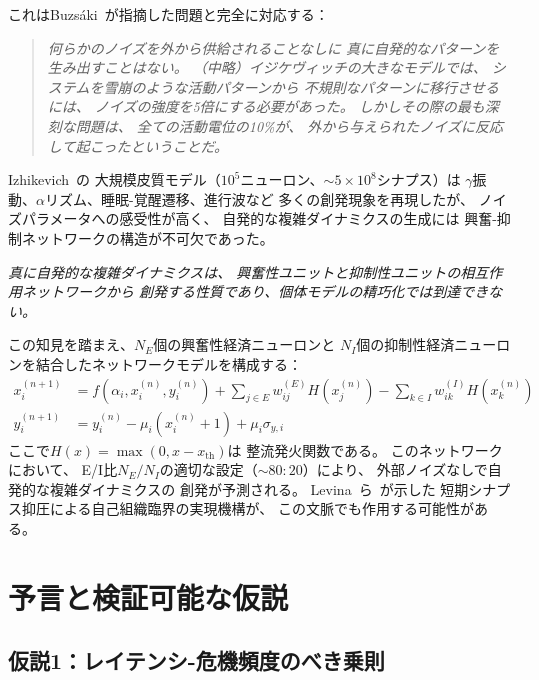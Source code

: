 \documentclass[12pt,twocolumn]{ltjsarticle}
\begin{document}
これはBuzs\'{a}ki~\cite{Buzsaki2006}が指摘した問題と完全に対応する：

\begin{quote}
\emph{何らかのノイズを外から供給されることなしに
真に自発的なパターンを生み出すことはない。
（中略）イジケヴィッチの大きなモデルでは、
システムを雪崩のような活動パターンから
不規則なパターンに移行させるには、
ノイズの強度を5倍にする必要があった。
しかしその際の最も深刻な問題は、
全ての活動電位の10\%が、
外から与えられたノイズに反応して起こったということだ。}
\end{quote}

Izhikevich~\cite{Izhikevich2006}の
大規模皮質モデル（$10^5$ニューロン、$\sim 5 \times 10^8$シナプス）は
$\gamma$振動、$\alpha$リズム、睡眠-覚醒遷移、進行波など
多くの創発現象を再現したが、
ノイズパラメータへの感受性が高く、
自発的な複雑ダイナミクスの生成には
興奮-抑制ネットワークの構造が不可欠であった。

\emph{真に自発的な複雑ダイナミクスは、
興奮性ユニットと抑制性ユニットの相互作用ネットワークから
創発する性質であり、個体モデルの精巧化では到達できない。}

この知見を踏まえ、$N_E$個の興奮性経済ニューロンと
$N_I$個の抑制性経済ニューロンを結合したネットワークモデルを構成する：
\begin{align}
x_i^{(n+1)} &= f(\alpha_i, x_i^{(n)}, y_i^{(n)})
+ \sum_{j \in E} w_{ij}^{(E)} H(x_j^{(n)})
- \sum_{k \in I} w_{ik}^{(I)} H(x_k^{(n)}) \\
y_i^{(n+1)} &= y_i^{(n)} - \mu_i(x_i^{(n)} + 1) + \mu_i \sigma_{y,i}
\end{align}
ここで$H(x) = \max(0, x - x_{\text{th}})$は
整流発火関数である。
このネットワークにおいて、
E/I比$N_E/N_I$の適切な設定（$\sim 80:20$）により、
外部ノイズなしで自発的な複雑ダイナミクスの
創発が予測される。
Levina~ら~\cite{Levina2007}が示した
短期シナプス抑圧による自己組織臨界の実現機構が、
この文脈でも作用する可能性がある。


\section{予言と検証可能な仮説}
\label{sec:prediction}

\subsection{仮説1：レイテンシ-危機頻度のべき乗則}
\end{document}
